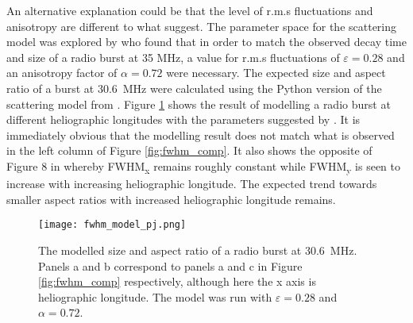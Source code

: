 An alternative explanation could be that the level of r.m.s fluctuations and anisotropy are different to what \cite{Kontar2019} suggest. The parameter space for the scattering model was explored by \cite{Zhang2021} who found that in order to match the observed decay time and size of a radio burst at 35 MHz, a value for r.m.s fluctuations of $\varepsilon = 0.28$ and an anisotropy factor of $\alpha = 0.72$ were necessary. The expected size and aspect ratio of a burst at 30.6~MHz were calculated using the Python version of the \cite{Kontar2019} scattering model from \cite{Zhang2021}. Figure \ref{fig:model_comp} shows the result of modelling a radio burst at different heliographic longitudes with the parameters suggested by \cite{Zhang2021}. It is immediately obvious that the modelling result does not match what is observed in the left column of Figure \ref{fig:fwhm_comp}. It also shows the opposite of Figure 8 in \cite{Kontar2019} whereby FWHM\textsubscript{x} remains roughly constant while FWHM\textsubscript{y} is seen to increase with increasing heliographic longitude. The expected trend towards smaller aspect ratios with increased heliographic longitude remains.

\begin{figure}[ht]
\centering
\texttt{[image: fwhm\_model\_pj.png]}
\caption[The modelled size and aspect ratio of a radio burst at 30.6~MHz.]{The modelled size and aspect ratio of a radio burst at 30.6~MHz. Panels a and b correspond to panels a and c in Figure \ref{fig:fwhm_comp} respectively, although here the x axis is heliographic longitude. The model was run with $\varepsilon = 0.28$ and $\alpha = 0.72$.}
\label{fig:model_comp}
\end{figure}


